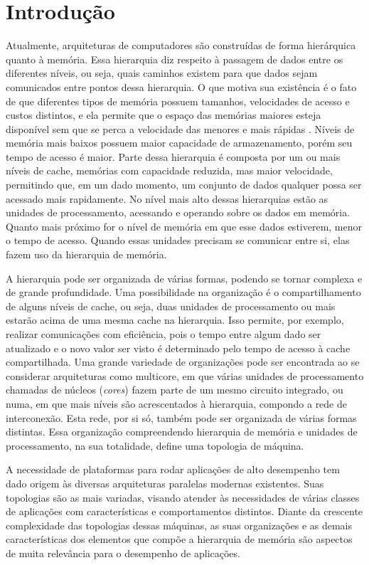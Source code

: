 \chapter{Introdução}
\label{cap:introducao}
\acresetall


Atualmente, arquiteturas de computadores são construídas de forma hierárquica quanto à memória.
Essa hierarquia diz respeito à passagem de dados entre os diferentes níveis, ou seja, quais caminhos existem para que dados sejam comunicados entre pontos dessa hierarquia.
O que motiva sua existência é o fato de que diferentes tipos de memória possuem tamanhos, velocidades de acesso e custos distintos, e ela permite que o espaço das memórias maiores esteja disponível sem que se perca a velocidade das menores e mais rápidas \cite{Patterson}.
Níveis de memória mais baixos possuem maior capacidade de armazenamento, porém seu tempo de acesso é maior.
Parte dessa hierarquia é composta por um ou mais níveis de cache, memórias com capacidade reduzida, mas maior velocidade, permitindo que, em um dado momento, um conjunto de dados qualquer possa ser acessado mais rapidamente.
No nível mais alto dessas hierarquias estão as unidades de processamento, acessando e operando sobre os dados em memória.
Quanto mais próximo for o nível de memória em que esse dados estiverem, menor o tempo de acesso.
Quando essas unidades precisam se comunicar entre si, elas fazem uso da hierarquia de memória.

A hierarquia pode ser organizada de várias formas, podendo se tornar complexa e de grande profundidade.
Uma possibilidade na organização é o compartilhamento de alguns níveis de cache, ou seja, duas unidades de processamento ou mais estarão acima de uma mesma cache na hierarquia.
Isso permite, por exemplo, realizar comunicações com eficiência, pois o tempo entre algum dado ser atualizado e o novo valor ser visto é determinado pelo tempo de acesso à cache compartilhada.
Uma grande variedade de organizações pode ser encontrada ao se considerar arquiteturas como multicore, em que várias unidades de processamento chamadas de núcleos (\textit{cores}) fazem parte de um mesmo circuito integrado, ou \ac{numa}, em que mais níveis são acrescentados à hierarquia, compondo a rede de interconexão. Esta rede, por si só, também pode ser organizada de várias formas distintas.
Essa organização compreendendo hierarquia de memória e unidades de processamento, na sua totalidade, define uma topologia de máquina.

A necessidade de plataformas para rodar aplicações de alto desempenho tem dado origem às diversas arquiteturas paralelas modernas existentes.
Suas topologias são as mais variadas, visando atender às necessidades de várias classes de aplicações com características e comportamentos distintos.
Diante da crescente complexidade das topologias dessas máquinas, as suas organizações e as demais características dos elementos que compõe a hierarquia de memória são aspectos de muita relevância para o desempenho de aplicações.

